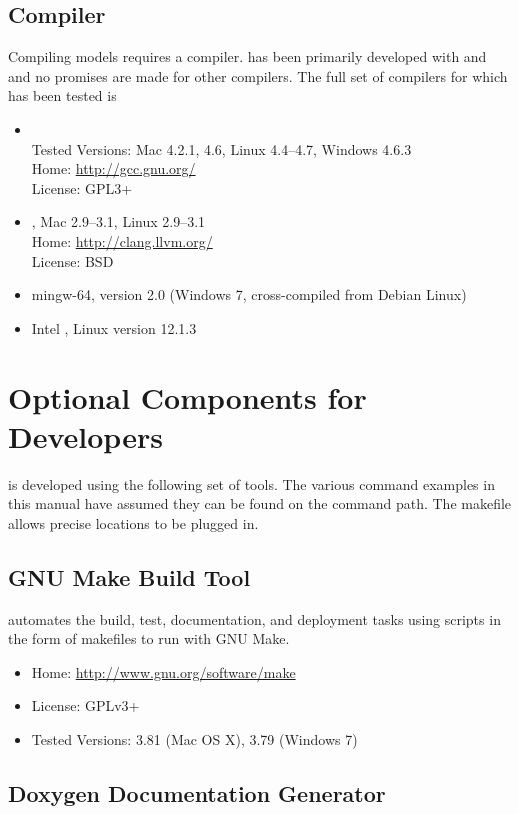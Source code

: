 \subsection{\Cpp Compiler}

Compiling \Stan models requires a \Cpp compiler.  \Stan has been
primarily developed with \clang and \gpp and no promises are made for
other compilers.  The full set of compilers for which \Stan has been
tested is
%
\begin{itemize}
%
\item \gpp
\\
Tested Versions: Mac 4.2.1, 4.6, Linux 4.4--4.7, Windows 4.6.3
\\
Home: \url{http://gcc.gnu.org/}
\\
License: GPL3+
%
\item \clang, Mac 2.9--3.1, Linux 2.9--3.1
\\
Home: \url{http://clang.llvm.org/}
\\
License: BSD
%
\item mingw-64, version 2.0 (Windows 7, cross-compiled from Debian Linux)
%
\item Intel \Cpp, Linux version 12.1.3
%
\end{itemize}
%

\section{Optional Components for Developers}

\Stan is developed using the following set of tools.  The various
command examples in this manual have assumed they can be found on
the command path.  The makefile allows precise locations to be plugged
in. 

\subsection{GNU Make Build Tool}

\Stan automates the build, test, documentation, and deployment tasks
using scripts in the form of makefiles to run with GNU Make.
%
\begin{itemize}
\item Home: \url{http://www.gnu.org/software/make}
\item License: GPLv3+
\item Tested Versions: 3.81 (Mac OS X), 3.79 (Windows 7)
\end{itemize}
%


\subsection{Doxygen Documentation Generator}

